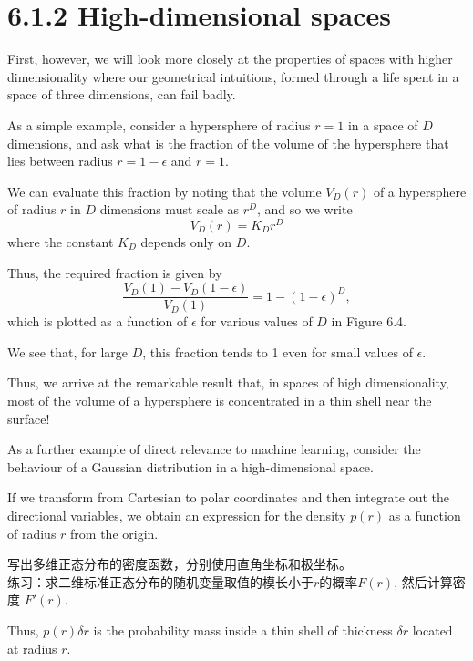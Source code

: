 \documentclass{article}
\begin{document}
\section{6.1.2 High-dimensional spaces}

First, however, we will look more closely at the properties of spaces with higher dimensionality where our geometrical intuitions, formed through a life spent in a space of three dimensions, can fail badly. 

As a simple example, consider a hypersphere of radius $r = 1$ in a space of $D$ dimensions, and ask what is the fraction of the volume of the hypersphere that lies between radius $r = 1 - \epsilon$ and $r = 1$. 

We can evaluate this fraction by noting that the volume $V_D(r)$ of a hypersphere of radius $r$ in $D$ dimensions must scale as $r^D$, and so we write
\begin{equation}
V_D(r) = K_D r^D
\end{equation}
where the constant $K_D$ depends only on $D$. 

Thus, the required fraction is given by
\begin{equation}
\frac{V_D(1) - V_D(1 - \epsilon)}{V_D(1)} = 1 - (1 - \epsilon)^D,
\end{equation}
which is plotted as a function of $\epsilon$ for various values of $D$ in Figure 6.4. 

We see that, for large $D$, this fraction tends to 1 even for small values of $\epsilon$. 

Thus, we arrive at the remarkable result that, in spaces of high dimensionality, most of the volume of a hypersphere is concentrated in a thin shell near the surface!

As a further example of direct relevance to machine learning, consider the behaviour of a Gaussian distribution in a high-dimensional space. 

If we transform from Cartesian to polar coordinates and then integrate out the directional variables, we obtain an expression for the density $p(r)$ as a  function of radius $r$ from the origin. 

{\color{red}
写出多维正态分布的密度函数，分别使用直角坐标和极坐标。\\
练习：求二维标准正态分布的随机变量取值的模长小于$r$的概率$F(r)$, 然后计算密度 $F'(r)$. 
}

Thus, $p(r)\delta r$ is the probability mass inside a thin shell of thickness $\delta r$ located at radius $r$. 
\end{document}
